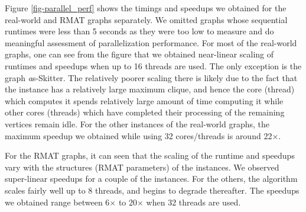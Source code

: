 Figure \ref{fig-parallel_perf} shows the timings and speedups we obtained for the real-world and RMAT graphs separately. We omitted graphs whose sequential runtimes were less than 5 seconds as they were too low to measure and do meaningful assessment of parallelization performance. For most of the real-world graphs, one can see from the figure that we obtained near-linear scaling of runtimes and speedups when up to 16 threads are used. The only exception is the graph 
{\emph as-Skitter}. The relatively poorer scaling there is likely due to the fact that the instance has a relatively large maximum clique, and hence the core (thread) which computes it spends relatively large amount of time computing it while other cores (threads) which have completed their processing of the remaining vertices remain idle. 
For the other instances of the real-world graphs, the maximum speedup we obtained 
while using 32 cores/threads is around 22$\times$. 

For the RMAT graphs, it can seen that the scaling of the runtime and speedups vary with the structures (RMAT parameters) of the instances. We observed super-linear speedups for a couple of the instances. For the others, the algorithm scales fairly well up to 8 threads, and begins to
degrade thereafter. The speedups we obtained range between 6$\times$  to 20$\times$ when 32 threads are used.









